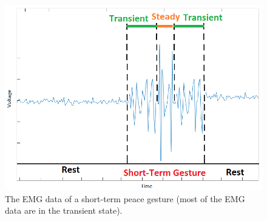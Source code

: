\documentclass[sensors,review,accept,moreauthors,pdftex]{Definitions/mdpi}
\begin{document}
\begin{figure}[H]
	\centering
	\includegraphics[scale=0.8]{short}
	\caption{The EMG data of a short-term peace gesture (most of the EMG data are in the transient state).}
	\label{fig:55}
	
\end{figure}
		
\end{document}
